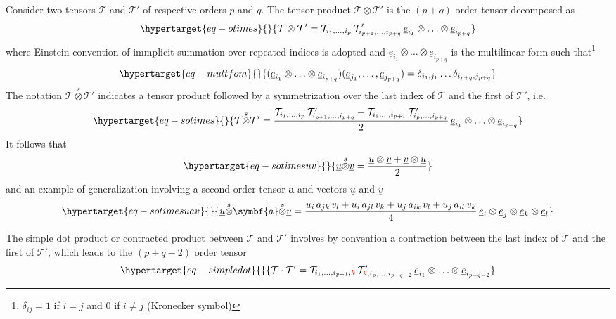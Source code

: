 \documentclass[
  letterpaper,
  DIV=11,
  numbers=noendperiod]{scrreprt}
\newcommand{\uu}[1]{{\symbf{{#1}}}}
\newcommand{\uv}[1]{{\underline{{#1}}}}
\newcommand{\ve}[1]{{\uv{{e}}_{{#1}}}}
\newcommand{\sotimes}{{\stackrel{s}{\otimes}}}
\begin{document}
Consider two tensors \(\mathcal{T}\) and \(\mathcal{T}'\) of respective
orders \(p\) and \(q\). The tensor product
\(\mathcal{T}\otimes\mathcal{T}'\) is the \((p+q)\) order tensor
decomposed as \begin{equation}\protect\hypertarget{eq-otimes}{}{
\mathcal{T}\otimes\mathcal{T}'=\mathcal{T}_{i_1,\ldots,i_p} \,\mathcal{T}'_{i_{p+1},\ldots,i_{p+q}}\,
\ve{i_1}\otimes\ldots\otimes\ve{i_{p+q}}
}\label{eq-otimes}\end{equation} where Einstein convention of immplicit
summation over repeated indices is adopted and
\(\ve{i_1}\otimes\ldots\otimes\ve{i_{p+q}}\) is the multilinear form
such that\footnote{\(\delta_{ij}=1\) if \(i=j\) and \(0\) if \(i\neq j\)
  (Kronecker symbol)}
\begin{equation}\protect\hypertarget{eq-multfom}{}{
(\ve{i_1}\otimes\ldots\otimes\ve{i_{p+q}})(\ve{j_1},\ldots,\ve{j_{p+q}})
=
\delta_{i_1,j_1}\ldots \delta_{i_{p+q},j_{p+q}}
}\label{eq-multfom}\end{equation} The notation
\(\mathcal{T}\sotimes\mathcal{T}'\) indicates a tensor product followed
by a symmetrization over the last index of \(\mathcal{T}\) and the first
of \(\mathcal{T}'\), i.e.
\begin{equation}\protect\hypertarget{eq-sotimes}{}{
\mathcal{T}\sotimes\mathcal{T}'=
\frac{\mathcal{T}_{i_1,\ldots,i_p} \,\mathcal{T}'_{i_{p+1},\ldots,i_{p+q}}
+
\mathcal{T}_{i_1,\ldots,i_{p+1}} \,\mathcal{T}'_{i_p,\ldots,i_{p+q}}
}{2}
\,\ve{i_1}\otimes\ldots\otimes\ve{i_{p+q}}
}\label{eq-sotimes}\end{equation} It follows that
\begin{equation}\protect\hypertarget{eq-sotimesuv}{}{
\uv{u}\sotimes\uv{v}=\frac{\uv{u}\otimes\uv{v}+\uv{v}\otimes\uv{u}}{2}
}\label{eq-sotimesuv}\end{equation} and an example of generalization
involving a second-order tensor \(\uu{a}\) and vectors \(\uv{u}\) and
\(\uv{v}\) \begin{equation}\protect\hypertarget{eq-sotimesuav}{}{
\uv{u}\sotimes\uu{a}\sotimes\uv{v}=
\frac{u_i\,a_{jk}\,v_l+u_i\,a_{jl}\,v_k+u_j\,a_{ik}\,v_l+u_j\,a_{il}\,v_k}{4}
\,\ve{i}\otimes\ve{j}\otimes\ve{k}\otimes\ve{l}
}\label{eq-sotimesuav}\end{equation}

The simple dot product or contracted product between \(\mathcal{T}\) and
\(\mathcal{T}'\) involves by convention a contraction between the last
index of \(\mathcal{T}\) and the first of \(\mathcal{T}'\), which leads
to the \((p+q-2)\) order tensor
\begin{equation}\protect\hypertarget{eq-simpledot}{}{
\mathcal{T}\cdot\mathcal{T}'=\mathcal{T}_{i_1,\ldots,i_{p-1},{\color{red}k}} \,\mathcal{T}'_{{\color{red}k},i_{p},\ldots,i_{p+q-2}}\,
\ve{i_1}\otimes\ldots\otimes\ve{i_{p+q-2}}
}\label{eq-simpledot}\end{equation}
\end{document}
